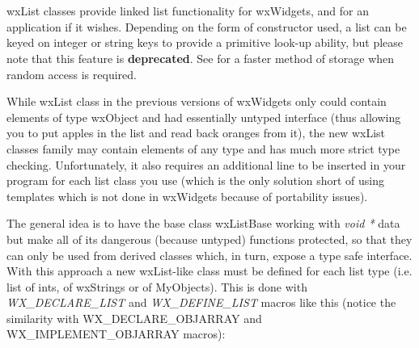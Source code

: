 \section{}\label{wxlist}

wxList classes provide linked list functionality for wxWidgets, and for an
application if it wishes.  Depending on the form of constructor used, a list
can be keyed on integer or string keys to provide a primitive look-up ability,
but please note that this feature is {\bf deprecated}.
See \rtfsp for a faster method of storage
when random access is required.

While wxList class in the previous versions of wxWidgets only could contain
elements of type wxObject and had essentially untyped interface (thus allowing
you to put apples in the list and read back oranges from it), the new wxList
classes family may contain elements of any type and has much more strict type
checking. Unfortunately, it also requires an additional line to be inserted in
your program for each list class you use (which is the only solution short of
using templates which is not done in wxWidgets because of portability issues).

The general idea is to have the base class wxListBase working with {\it void *}
data but make all of its dangerous (because untyped) functions protected, so
that they can only be used from derived classes which, in turn, expose a type
safe interface. With this approach a new wxList-like class must be defined for
each list type (i.e. list of ints, of wxStrings or of MyObjects). This is done
with {\it WX\_DECLARE\_LIST} and {\it WX\_DEFINE\_LIST} macros like this
(notice the similarity with WX\_DECLARE\_OBJARRAY and WX\_IMPLEMENT\_OBJARRAY
macros):


